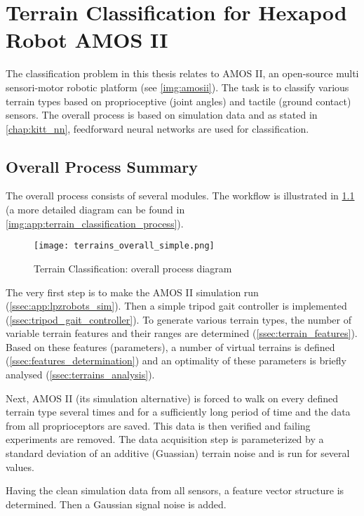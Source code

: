 \chapter{Terrain Classification for Hexapod Robot AMOS II} \label{chap:terrain_classification}

The classification problem in this thesis relates to AMOS II, an open-source multi sensori-motor robotic platform (see \cref{img:amosii}). The task is to classify various terrain types based on proprioceptive (joint angles) and tactile (ground contact) sensors. The overall process is based on simulation data and as stated in \cref{chap:kitt_nn}, feedforward neural networks are used for classification.

\section{Overall Process Summary} \label{sec:overall_process_summary}
The overall process consists of several modules. The workflow is illustrated in \cref{img:terrain_overall_simple} (a more detailed diagram can be found in \cref{img:app:terrain_classification_process}).

\begin{figure}[H]
  \centering
  \texttt{[image: terrains\_overall\_simple.png]}
  \caption{Terrain Classification: overall process diagram}
  \label{img:terrain_overall_simple}
\end{figure}

The very first step is to make the AMOS II simulation run (\cref{ssec:app:lpzrobots_sim}). Then a simple tripod gait controller is implemented (\cref{ssec:tripod_gait_controller}). To generate various terrain types, the number of variable terrain features and their ranges are determined (\cref{ssec:terrain_features}). Based on these features (parameters), a number of virtual terrains is defined (\cref{ssec:features_determination}) and an optimality of these parameters is briefly analysed (\cref{ssec:terrains_analysis}).

Next, AMOS II (its simulation alternative) is forced to walk on every defined terrain type several times and for a sufficiently long period of time and the data from all proprioceptors are saved. This data is then verified and failing experiments are removed. The data acquisition step is parameterized by a standard deviation of an additive (Guassian) terrain noise and is run for several values.

Having the clean simulation data from all sensors, a feature vector structure is determined. Then a Gaussian signal noise is added. 

